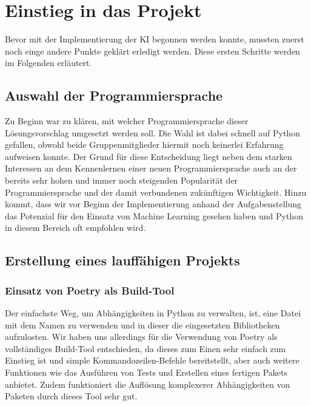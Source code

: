 \chapter{Einstieg in das Projekt}
\label{ch:planung}

Bevor mit der Implementierung der \ac{KI} begonnen werden konnte, mussten zuerst noch einge andere Punkte geklärt
\bzw erledigt werden.
Diese ersten Schritte werden im Folgenden erläutert.

\section{Auswahl der Programmiersprache}
\label{sec:auswahl-programmiersprache}

Zu Beginn war zu klären, mit welcher Programmiersprache dieser Lösungsvorschlag umgesetzt werden soll.
Die Wahl ist dabei schnell auf Python gefallen, obwohl beide Gruppenmitglieder hiermit noch keinerlei Erfahrung
aufweisen konnte.
Der Grund für diese Entscheidung liegt neben dem starken Interessen an dem Kennenlernen einer neuen Programmiersprache
auch an der bereits sehr hohen und immer noch steigenden Popularität der Programmiersprache und der damit verbundenen
zukünftigen Wichtigkeit.  
Hinzu kommt, dass wir vor Beginn der Implementierung anhand der Aufgabenstellung das Potenzial für den Einsatz von
Machine Learning gesehen haben und Python in diesem Bereich oft empfohlen wird.  

\section{Erstellung eines lauffähigen Projekts}
\label{sec:erstellung-projekt}

\subsection{Einsatz von Poetry als Build-Tool}
\label{subsec:poetry}

Der einfachste Weg, um Abhängigkeiten in Python zu verwalten, ist, eine Datei mit dem Namen  zu
verwenden und in dieser die eingesetzten Bibliotheken aufzulosten.
Wir haben uns allerdings für die Verwendung von Poetry als vollständiges Build-Tool entschieden, da dieses zum Einen
sehr einfach zum Einstieg ist und simple Kommandozeilen-Befehle bereitstellt, aber auch weitere Funktionen wie das
Ausführen von Tests und Erstellen eines fertigen Pakets anbietet.
Zudem funktioniert die Auflösung komplexerer Abhängigkeiten von Paketen durch dieses Tool sehr gut. 

